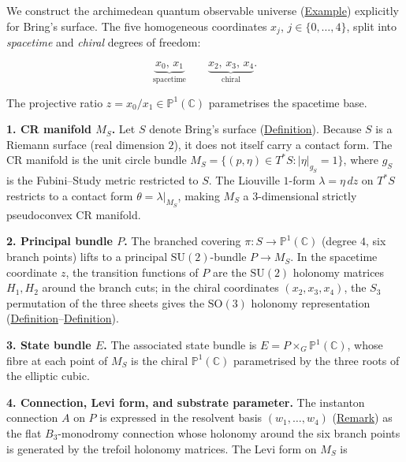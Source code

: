 \begin{remark}
  \label{rem:brings-qou-4tuple}
We construct the archimedean quantum observable universe
(\hyperref[def:c-quantum-observable-universe]{Example}) explicitly for Bring's
surface.  The five homogeneous coordinates $x_j$, $j\in\{0,\dots,4\}$,
split into \emph{spacetime} and \emph{chiral} degrees of freedom:

\[
\underbrace{x_0,\, x_1}_{\text{spacetime}}
  \qquad
  \underbrace{x_2,\, x_3,\, x_4}_{\text{chiral}}.
\]

The projective ratio $z = x_0/x_1 \in \mathbb{P}^1(\mathbb{C})$ parametrises the
spacetime base.

\textbf{1. CR manifold $M_S$.}
Let $S$ denote Bring's surface (\hyperref[def:brings-surface]{Definition}).
Because $S$ is a Riemann surface (real dimension $2$), it does not itself
carry a contact form.  The CR manifold is the unit circle bundle
$M_S = \{(p,\eta) \in T^*S : \lvert\eta\rvert_{g_S} = 1\}$,
where $g_S$ is the Fubini--Study metric restricted to $S$.  The Liouville
$1$-form $\lambda = \eta\,dz$ on $T^*S$ restricts to a contact form
$\theta = \lambda\big|_{M_S}$, making $M_S$ a $3$-dimensional strictly
pseudoconvex CR manifold.

\textbf{2. Principal bundle $P$.}
The branched covering $\pi\colon S \to \mathbb{P}^1(\mathbb{C})$ (degree $4$, six
branch points) lifts to a principal $\mathrm{SU}(2)$-bundle
$P \to M_S$.  In the spacetime coordinate $z$, the transition functions
of $P$ are the $\mathrm{SU}(2)$ holonomy matrices
$H_1,H_2$ around the branch cuts; in the
chiral coordinates $(x_2,x_3,x_4)$, the $S_3$ permutation of the three
sheets gives the $\mathrm{SO}(3)$ holonomy representation
(\hyperref[def:su2-generators]{Definition}--\hyperref[def:so3-generators]{Definition}).

\textbf{3. State bundle $E$.}
The associated state bundle is $E = P \times_G \mathbb{P}^1(\mathbb{C})$,
whose fibre at each point of $M_S$ is the chiral
$\mathbb{P}^1(\mathbb{C})$ parametrised by the three roots of the elliptic
cubic.

\textbf{4. Connection, Levi form, and substrate parameter.}
The instanton connection $A$ on $P$ is expressed in the resolvent basis
$(w_1,\dots,w_4)$ (\hyperref[rem:lagrange-resolvents]{Remark}) as the flat
$B_3$-monodromy connection whose holonomy around the six branch points is
generated by the trefoil holonomy matrices.  The Levi form on $M_S$ is


\end{remark}
